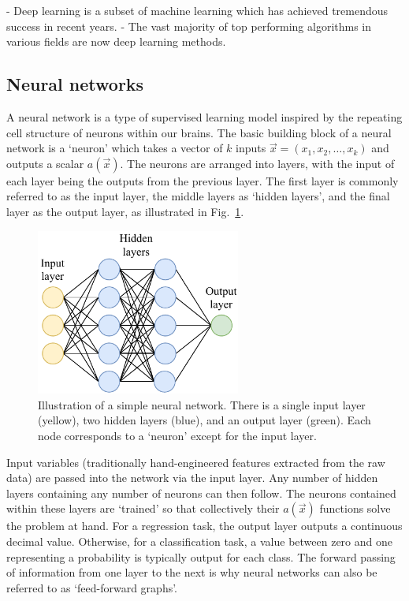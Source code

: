 - Deep learning is a subset of machine learning which has achieved tremendous success in recent
years.
- The vast majority of top performing algorithms in various fields are now deep learning methods.

\subsection{Neural networks} %
\label{sec:cvn_theory_basic} %

A neural network is a type of supervised learning model inspired by the repeating cell structure
of neurons within our brains. The basic building block of a neural network is a `neuron' which
takes a vector of $k$ inputs $\vec{x} = (x_{1}, x_{2},\dots,x_{k})$ and outputs a scalar
$a(\vec{x})$. The neurons are arranged into layers, with the input of each layer being the outputs
from the previous layer. The first layer is commonly referred to as the input layer, the middle
layers as `hidden layers', and the final layer as the output layer, as illustrated in
Fig.~\ref{fig:network}.

\begin{figure} %
    \includegraphics[width=0.6\textwidth]{diagrams/7-cvn/network.pdf}
    \caption[Illustration of a simple neural network]
    {Illustration of a simple neural network. There is a single input layer (yellow), two hidden
        layers (blue), and an output layer (green). Each node corresponds to a `neuron' except for
        the input layer.}
    \label{fig:network}
\end{figure}

Input variables (traditionally hand-engineered features extracted from the raw data) are passed
into the network via the input layer. Any number of hidden layers containing any number of neurons
can then follow. The neurons contained within these layers are `trained' so that collectively
their $a(\vec{x})$ functions solve the problem at hand. For a regression task, the output layer
outputs a continuous decimal value. Otherwise, for a classification task, a value between zero and
one representing a probability is typically output for each class. The forward passing of
information from one layer to the next is why neural networks can also be referred to as
`feed-forward graphs'.

